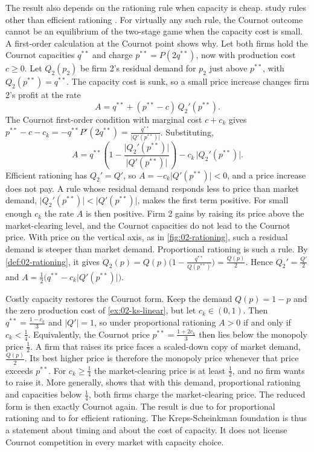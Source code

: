  The result also depends on the rationing rule when capacity is cheap.
\citet{DavidsonDeneckere1986} study rules other than efficient rationing \citep[secs.~5.3.4 and 5.7.2.3]{Tirole1988}.
For virtually any such rule, the Cournot outcome cannot be an equilibrium of the two-stage game when the capacity
cost is small. A first-order calculation at the Cournot point shows why. Let both firms hold the Cournot
capacities $q^{**}$ and charge $p^{**} = P(2q^{**})$, now with production cost $c \ge 0$. Let $Q_2(p_2)$ be firm 2's
residual demand for $p_2$ just above $p^{**}$, with $Q_2(p^{**}) = q^{**}$. The capacity cost is sunk, so a small
price increase changes firm 2's profit at the rate
\[
  A = q^{**} + (p^{**} - c)\,Q_2'(p^{**}) .
\]
The Cournot first-order condition with marginal cost $c + c_k$ gives $p^{**} - c - c_k = -q^{**}P'(2q^{**}) =
\frac{q^{**}}{\lvert Q'(p^{**})\rvert}$. Substituting,
\begin{equation}\label{eq:02-dd}
  A = q^{**}\left(1 - \frac{\lvert Q_2'(p^{**})\rvert}{\lvert Q'(p^{**})\rvert}\right)
      - c_k\,\lvert Q_2'(p^{**})\rvert .
\end{equation}
Efficient rationing has $Q_2' = Q'$, so $A = -c_k\lvert Q'(p^{**})\rvert < 0$, and a price increase does not pay. A
rule whose residual demand responds less to price than market demand, $\lvert Q_2'(p^{**})\rvert < \lvert
Q'(p^{**})\rvert$, makes the first term positive. For small enough $c_k$ the rate $A$ is then positive. Firm 2 gains
by raising its price above the market-clearing level, and the Cournot capacities do not lead to the Cournot price.
With price on the vertical axis, as in \cref{fig:02-rationing}, such a residual demand is steeper than market demand.
Proportional rationing is such a rule. By \cref{def:02-rationing}, it
gives $Q_2(p) = Q(p)\bigl(1 - \frac{q^{**}}{Q(p^{**})}\bigr) = \frac{Q(p)}{2}$. Hence $Q_2' = \frac{Q'}{2}$ and
$A = \frac{1}{2}\bigl(q^{**} - c_k\lvert Q'(p^{**})\rvert\bigr)$.

Costly capacity restores the Cournot form. Keep the demand $Q(p) = 1 - p$ and the zero production cost of
\cref{ex:02-ks-linear}, but let $c_k \in (0, 1)$. Then $q^{**} = \frac{1 - c_k}{3}$ and $\lvert Q'\rvert = 1$, so
under proportional rationing $A > 0$ if and only if $c_k < \frac{1}{4}$.
Equivalently, the Cournot price $p^{**} = \frac{1 + 2c_k}{3}$ then lies below the monopoly price $\frac{1}{2}$. A firm
that raises its price faces a scaled-down copy of market demand, $\frac{Q(p)}{2}$. Its best higher price is therefore
the monopoly price whenever that price exceeds $p^{**}$. For $c_k \ge \frac{1}{4}$ the market-clearing price is at
least $\frac{1}{2}$, and no firm wants to raise it. More generally, \citet[Exercise~5.2]{Tirole1988} shows that with
this demand, proportional rationing and capacities below $\frac{1}{4}$, both firms charge the market-clearing price.
The reduced form is then exactly Cournot again. The result is due to \citet{Beckmann1967} for proportional rationing
and to \citet{LevitanShubik1972} for efficient rationing. The Kreps-Scheinkman foundation is thus a statement about
timing and about the cost of capacity. It does not license Cournot competition in every market with capacity choice.

